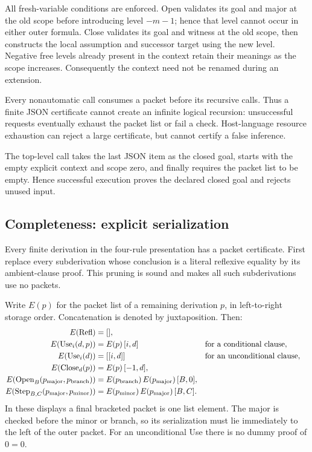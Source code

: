All fresh-variable conditions are enforced. Open validates its goal
and major at the old scope before introducing level \(-m-1\); hence
that level cannot occur in either outer formula. Close validates its
goal and witness at the old scope, then constructs the local assumption
and successor target using the new level. Negative free levels already
present in the context retain their meanings as the scope increases.
Consequently the context need not be renamed during an extension.

Every nonautomatic call consumes a packet before its recursive calls.
Thus a finite JSON certificate cannot create an infinite logical
recursion: unsuccessful requests eventually exhaust the packet list
or fail a check. Host-language resource exhaustion can reject a large
certificate, but cannot certify a false inference.

The top-level call takes the last JSON item as the closed goal, starts
with the empty explicit context and scope zero, and finally requires
the packet list to be empty. Hence successful execution proves the
declared closed goal and rejects unused input.

\subsection{Completeness: explicit serialization}
Every finite derivation in the four-rule presentation has a packet
certificate. First replace every subderivation whose conclusion is a
literal reflexive equality by its ambient-clause proof. This pruning
is sound and makes all such subderivations use no packets.

Write \(E(p)\) for the packet list of a remaining derivation \(p\), in
left-to-right storage order. Concatenation is denoted by juxtaposition.
Then:
\begin{align*}
 E(\mathrm{Refl})&=[],\\
 E(\mathrm{Use}_i(d,p))&=E(p)\,[i,d]
       &&\text{for a conditional clause},\\
 E(\mathrm{Use}_i(d))&=[[i,d]]
       &&\text{for an unconditional clause},\\
 E(\mathrm{Close}_d(p))&=E(p)\,[-1,d],\\
 E(\mathrm{Open}_{B}(p_{\rm major},p_{\rm branch}))
    &=E(p_{\rm branch})\,E(p_{\rm major})\,[B,0],\\
 E(\mathrm{Step}_{B,C}(p_{\rm major},p_{\rm minor}))
    &=E(p_{\rm minor})\,E(p_{\rm major})\,[B,C].
\end{align*}
In these displays a final bracketed packet is one list element.
The major is checked before the minor or branch, so its serialization
must lie immediately to the left of the outer packet.
For an unconditional Use there is no dummy proof of \(0=0\).

